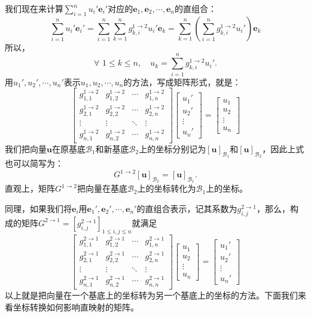 \documentclass[12pt,UTF8]{ctexbook}
\begin{document}
我们现在来计算$\sum_{i=1}^n u_i'\mathbf{e}_i' $对应的$\mathbf{e}_1, \mathbf{e}_2, \cdots, \mathbf{e}_n$的直组合：
$$\sum_{i=1}^n u_i'\mathbf{e}_i' = \sum_{i=1}^n \sum_{k=1}^n g_{k,i}^{1\rightarrow 2} u_i' \mathbf{e}_k = \sum_{k=1}^n \left(\sum_{i=1}^n g_{k,i}^{1\rightarrow 2} u_i'\right) \mathbf{e}_k$$
所以，
$$\forall \,\, 1 \leqslant k \leqslant n, \quad u_k = \sum_{i=1}^n g_{k,i}^{1\rightarrow 2} u_i'.$$
用$u_1', u_2', \cdots, u_n'$表示$u_1, u_2, \cdots, u_n$的方法，写成矩阵形式，就是：
$$\begin{bmatrix}g_{1,1}^{1\rightarrow 2} & g_{1,2}^{1\rightarrow 2} & \cdots & g_{1,n}^{1\rightarrow 2} \\ g_{2,1}^{1\rightarrow 2} & g_{2,2}^{1\rightarrow 2} & \cdots & g_{2,n}^{1\rightarrow 2}\\ \vdots & \vdots & \ddots & \vdots \\ g_{n,1}^{1\rightarrow 2} & g_{n,2}^{1\rightarrow 2} & \cdots & g_{n,n}^{1\rightarrow 2}\end{bmatrix} \begin{bmatrix}u_1' \\ u_2'\\ \vdots\\ u_n'\end{bmatrix} = \begin{bmatrix}u_1 \\ u_2\\ \vdots\\ u_n\end{bmatrix}$$
我们把向量$\mathbf{u}$在原基底$\mathcal{B}_1$和新基底$\mathcal{B}_2$上的坐标分别记为$[\mathbf{u}]_{\mathcal{B}_1}$和$[\mathbf{u}]_{\mathcal{B}_2}$，因此上式也可以简写为：
$$ G^{1\rightarrow 2} [\mathbf{u}]_{\mathcal{B}_2} = [\mathbf{u}]_{\mathcal{B}_1}. $$
直观上，矩阵$G^{1\rightarrow 2}$把向量在基底$\mathcal{B}_2$上的坐标转化为$\mathcal{B}_1$上的坐标。

同理，如果我们将$\mathbf{e}_i$用$\mathbf{e}_1', \mathbf{e}_2', \cdots, \mathbf{e}_n'$的直组合表示，记其系数为$g_{i,j}^{2\rightarrow 1}$，那么，构成的矩阵$G^{2\rightarrow 1} = \left[g_{i,j}^{2\rightarrow 1}\right]_{1\leqslant i , j \leqslant n}$就满足
$$\begin{bmatrix}g_{1,1}^{2\rightarrow 1} & g_{1,2}^{2\rightarrow 1} & \cdots & g_{1,n}^{2\rightarrow 1} \\ g_{2,1}^{2\rightarrow 1} & g_{2,2}^{2\rightarrow 1} & \cdots & g_{2,n}^{2\rightarrow 1}\\ \vdots & \vdots & \ddots & \vdots \\ g_{n,1}^{2\rightarrow 1} & g_{n,2}^{2\rightarrow 1} & \cdots & g_{n,n}^{2\rightarrow 1}\end{bmatrix} \begin{bmatrix}u_1 \\ u_2\\ \vdots\\ u_n\end{bmatrix} = \begin{bmatrix}u_1' \\ u_2'\\ \vdots\\ u_n'\end{bmatrix}$$
以上就是把向量在一个基底上的坐标转为另一个基底上的坐标的方法。下面我们来看坐标转换如何影响直映射的矩阵。
\end{document}
